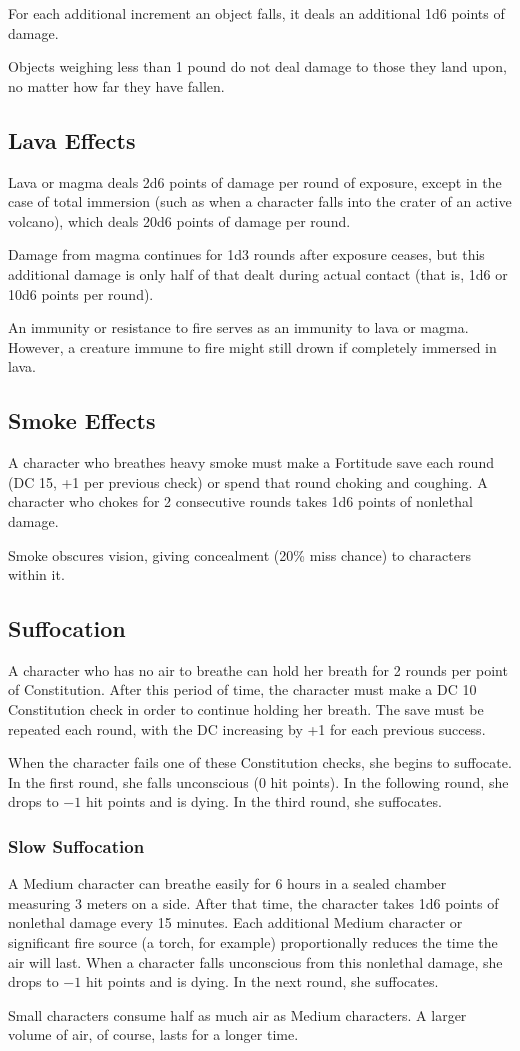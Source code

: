 For each additional increment an object falls, it deals an additional 1d6 points of damage.

Objects weighing less than 1 pound do not deal damage to those they land upon, no matter how far they have fallen.


\subsection{Lava Effects}
Lava or magma deals 2d6 points of damage per round of exposure, except in the case of total immersion (such as when a character falls into the crater of an active volcano), which deals 20d6 points of damage per round.

Damage from magma continues for 1d3 rounds after exposure ceases, but this additional damage is only half of that dealt during actual contact (that is, 1d6 or 10d6 points per round).

An immunity or resistance to fire serves as an immunity to lava or magma. However, a creature immune to fire might still drown if completely immersed in lava.


\subsection{Smoke Effects}
A character who breathes heavy smoke must make a Fortitude save each round (DC 15, +1 per previous check) or spend that round choking and coughing. A character who chokes for 2 consecutive rounds takes 1d6 points of nonlethal damage.

Smoke obscures vision, giving concealment (20\% miss chance) to characters within it.


\subsection{Suffocation}
A character who has no air to breathe can hold her breath for 2 rounds per point of Constitution. After this period of time, the character must make a DC 10 Constitution check in order to continue holding her breath. The save must be repeated each round, with the DC increasing by +1 for each previous success.

When the character fails one of these Constitution checks, she begins to suffocate. In the first round, she falls unconscious (0 hit points). In the following round, she drops to $-1$ hit points and is dying. In the third round, she suffocates.

\subsubsection{Slow Suffocation}
A Medium character can breathe easily for 6 hours in a sealed chamber measuring 3 meters on a side. After that time, the character takes 1d6 points of nonlethal damage every 15 minutes. Each additional Medium character or significant fire source (a torch, for example) proportionally reduces the time the air will last. When a character falls unconscious from this nonlethal damage, she drops to $-1$ hit points and is dying. In the next round, she suffocates.

Small characters consume half as much air as Medium characters. A larger volume of air, of course, lasts for a longer time.
